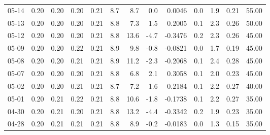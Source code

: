 \begin{threeparttable}
{\begin{tabular}{lrrrrrrrrrrrr}
  05-14 &          0.20 &          0.20 &          0.20 &        0.21 &                 8.7 &                 8.7 &        0.0 &       0.0046 &                 0.0 &              1.9 &            0.21 &                  55.00 \\
  05-13 &          0.20 &          0.20 &          0.20 &        0.21 &                 8.8 &                 7.3 &        1.5 &       0.2005 &                 0.1 &              2.3 &            0.26 &                  50.00 \\
  05-12 &          0.20 &          0.20 &          0.20 &        0.21 &                 8.8 &                13.6 &       -4.7 &      -0.3476 &                 0.2 &              2.3 &            0.26 &                  45.00 \\
  05-09 &          0.20 &          0.20 &          0.22 &        0.21 &                 8.9 &                 9.8 &       -0.8 &      -0.0821 &                 0.0 &              1.7 &            0.19 &                  45.00 \\
  05-08 &          0.20 &          0.20 &          0.21 &        0.21 &                 8.9 &                11.2 &       -2.3 &      -0.2068 &                 0.1 &              2.4 &            0.28 &                  45.00 \\
  05-07 &          0.20 &          0.20 &          0.20 &        0.21 &                 8.8 &                 6.8 &        2.1 &       0.3058 &                 0.1 &              2.0 &            0.23 &                  45.00 \\
  05-02 &          0.20 &          0.20 &          0.21 &        0.21 &                 8.7 &                 7.2 &        1.6 &       0.2184 &                 0.1 &              2.2 &            0.27 &                  40.00 \\
  05-01 &          0.20 &          0.21 &          0.22 &        0.21 &                 8.8 &                10.6 &       -1.8 &      -0.1738 &                 0.1 &              2.2 &            0.27 &                  35.00 \\
  04-30 &          0.20 &          0.21 &          0.20 &        0.21 &                 8.8 &                13.2 &       -4.4 &      -0.3342 &                 0.2 &              1.9 &            0.23 &                  35.00 \\
  04-28 &          0.20 &          0.21 &          0.21 &        0.21 &                 8.8 &                 8.9 &       -0.2 &      -0.0183 &                 0.0 &              1.3 &            0.15 &                  35.00 \\

\end{tabular}}
\end{threeparttable}

